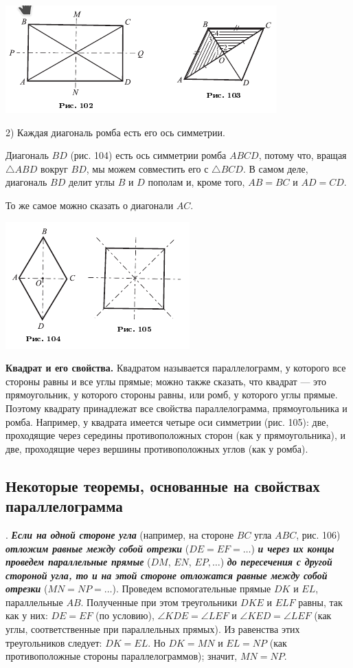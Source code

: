 \documentclass[oneside]{book}
\begin{document}
\includegraphics{pics/ris-102-103}

2) Каждая диагональ ромба есть его ось симметрии.

Диагональ $BD$ (рис. 104) есть ось симметрии ромба $ABCD$, потому что, вращая $\triangle ABD$ вокруг $BD$, мы можем совместить его с $\triangle BCD$.
В самом деле, диагональ $BD$ делит углы $B$ и $D$ пополам и, кроме того, $AB=BC$ и $AD=CD$.

То же самое можно сказать о диагонали $AC$.

\includegraphics{pics/ris-104-105}

\textbf{Квадрат и его свойства.}
Квадратом называется параллелограмм, у которого все стороны равны и все углы прямые;
можно также сказать, что квадрат — это прямоугольник, у которого стороны равны, или ромб, у которого углы прямые.
Поэтому квадрату принадлежат все свойства параллелограмма, прямоугольника и ромба.
Например, у квадрата имеется четыре оси симметрии (рис. 105):
две, проходящие через середины противоположных сторон (как у прямоугольника), и две, проходящие через вершины противоположных углов (как у ромба).

\subsection*{Некоторые теоремы, основанные на свойствах параллелограмма}

.
\textbf{\emph{Если на одной стороне угла}} (например, на стороне $BC$ угла $ABC$, рис. 106) \textbf{\emph{отложим равные между собой отрезки}} ($DE=EF=\dots$) \textbf{\emph{и через их концы проведем параллельные прямые}} ($DM$, $EN$, $EP,\dots$) \textbf{\emph{до пересечения с другой стороной угла, то и на этой стороне отложатся равные между собой отрезки}} ($MN=NP=\dots$).
Проведем вспомогательные прямые $DK$ и $EL$, параллельные $AB$.
Полученные при этом треугольники $DKE$ и $ELF$ равны, так как у них:
$DE=EF$ (по условию), $\angle KDE=\angle LEF$ и $\angle KED = \angle LEF$ (как углы, соответственные при параллельных прямых).
Из равенства этих треугольников следует:
$DK=EL$.
Но $DK=MN$ и $EL=NP$ (как противоположные стороны параллелограммов);
значит, $MN=NP$.
\end{document}
